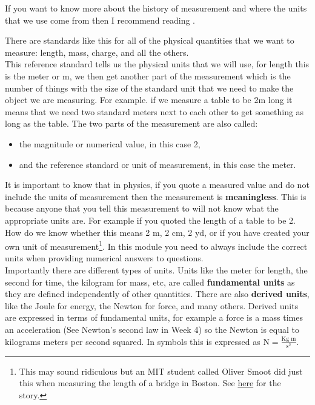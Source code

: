 If you want to know more about the history of measurement and where the units that we use come from then I recommend reading \citep{vincent2022beyond}.

There are standards like this for all of the physical quantities that we want to measure: length, mass, charge, and all the others. \\


This reference standard tells us the physical units that we will use, for length this is the meter or m, we then get another part of the measurement which is the number of things with the size of the standard unit that we need to make the object we are measuring. For example. if we measure a table to be 2m long it means that we need two standard meters next to each other to get something as long as the table. The two parts of the measurement are also called:
\begin{itemize}
\setlength{\itemsep}{-5pt}
    \item the magnitude or numerical value, in this case 2,
    \item and the reference standard or unit of measurement, in this case the meter.
\end{itemize}

It is important to know that in physics, if you quote a measured value and do not include the units of measurement then the measurement is \textbf{meaningless}. This is because anyone that you tell this measurement to will not know what the appropriate units are. For example if you quoted the length of a table to be 2. How do we know whether this means 2 m, 2 cm, 2 yd, or if you have created your own unit of measurement\footnote{This may sound ridiculous but an MIT student called Oliver Smoot did just this when measuring the length of a bridge in Boston. See \href{https://en.wikipedia.org/wiki/Smoot}{here} for the story.}. In this module you need to always include the correct units when providing numerical answers to questions.\\

Importantly there are different types of units. Units like the meter for length, the second for time, the kilogram for mass, etc, are called \textbf{fundamental units} as they are defined independently of other quantities.  There are also \textbf{derived units}, like the Joule for energy, the Newton for force, and many others. Derived units are expressed in terms of fundamental units, for example a force is a mass times an acceleration (See Newton's second law in Week 4) so the Newton is equal to kilograms meters per second squared. In symbols this is expressed as $\text{N}=\frac{\text{Kg m}}{\text{s}^{2}}$.\\

